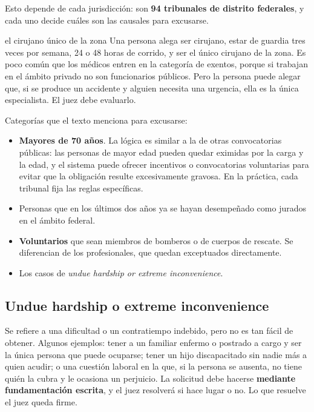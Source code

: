\documentclass[12pt,oneside]{book}
\begin{document}
Esto depende de cada jurisdicción: son \textbf{94 tribunales de distrito federales}, y cada uno decide cuáles son las causales para excusarse.

\begin{example}{el cirujano único de la zona}
Una persona alega ser cirujano, estar de guardia tres veces por semana, 24 o 48 horas de corrido, y ser el único cirujano de la zona. Es poco común que los médicos entren en la categoría de exentos, porque si trabajan en el ámbito privado no son funcionarios públicos. Pero la persona puede alegar que, si se produce un accidente y alguien necesita una urgencia, ella es la única especialista. El juez debe evaluarlo.
\end{example}

Categorías que el texto menciona para excusarse:
\begin{itemize}
\item \textbf{Mayores de 70 años}. La lógica es similar a la de otras convocatorias públicas: las personas de mayor edad pueden quedar eximidas por la carga y la edad, y el sistema puede ofrecer incentivos o convocatorias voluntarias para evitar que la obligación resulte excesivamente gravosa. En la práctica, cada tribunal fija las reglas específicas.
\item Personas que en los últimos dos años ya se hayan desempeñado como jurados en el ámbito federal.
\item \textbf{Voluntarios} que sean miembros de bomberos o de cuerpos de rescate. Se diferencian de los profesionales, que quedan exceptuados directamente.
\item Los casos de \textit{undue hardship or extreme inconvenience}.
\end{itemize}

\subsection{Undue hardship o extreme inconvenience}

Se refiere a una dificultad o un contratiempo indebido, pero no es tan fácil de obtener. Algunos ejemplos: tener a un familiar enfermo o postrado a cargo y ser la única persona que puede ocuparse; tener un hijo discapacitado sin nadie más a quien acudir; o una cuestión laboral en la que, si la persona se ausenta, no tiene quién la cubra y le ocasiona un perjuicio. La solicitud debe hacerse \textbf{mediante fundamentación escrita}, y el juez resolverá si hace lugar o no. Lo que resuelve el juez queda firme.
\end{document}
